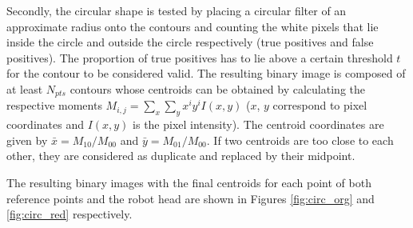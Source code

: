 Secondly, the circular shape is tested by placing a circular filter of an approximate radius onto the contours and counting the white pixels that lie inside the circle and outside the circle respectively (true positives and false positives). 
The proportion of true positives has to lie above a certain threshold $t$ for the contour to be considered valid.  
The resulting binary image is composed of at least $N_{pts}$ contours whose centroids can be obtained by calculating the respective moments $M_{i,j}=\sum_{x} \sum_{y} x^iy^i I(x,y)$ ($x$, $y$ correspond to pixel coordinates and $I(x,y)$ is the pixel intensity). 
The centroid coordinates are given by $\bar{x}=M_{10}/M_{00}$ and $\bar{y}=M_{01}/M_{00}$. If two centroids are too close to each other, they are considered as duplicate and replaced by their midpoint.

The resulting binary images with the final centroids for each point of both reference points and the robot head are shown in Figures \ref{fig:circ_org} and \ref{fig:circ_red} respectively.

